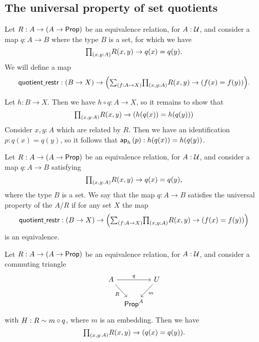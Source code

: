 \subsection{The universal property of set quotients}

\begin{defn}
Let $R:A\to (A\to \mathsf{Prop})$ be an equivalence relation, for $A:\mathcal{U}$, and consider a map $q:A\to B$ where the type $B$ is a set, for which we have
\begin{equation*}
\prd{x,y:A}R(x,y)\to q(x)=q(y).
\end{equation*}
We will define a map
\begin{equation*}
\quotientrestr:(B\to X) \to \Big(\sm{f:A\to X}\prd{x,y:A}R(x,y)\to (f(x)=f(y))\Big).
\end{equation*}
\end{defn}

\begin{constr}
Let $h:B\to X$. Then we have $h\circ q : A\to X$, so it remains to show that
\begin{equation*}
\prd{x,y:A}R(x,y)\to (h(q(x))=h(q(y)))
\end{equation*}
Consider $x,y:A$ which are related by $R$. Then we have an identification $p:q(x)=q(y)$, so it follows that $\mathsf{ap}_{h}\left({p}\right):h(q(x))=h(q(y))$.  
\end{constr}

\begin{defn}
Let $R:A\to (A\to \mathsf{Prop})$ be an equivalence relation, for $A:\mathcal{U}$, and consider a map $q:A\to B$ satisfying
\begin{equation*}
\prd{x,y:A}R(x,y)\to q(x)=q(y),
\end{equation*}
where the type $B$ is a set. We say that the map $q:A\to B$ satisfies the universal property of the  $A/R$ if for any set $X$ the map
\begin{equation*}
\quotientrestr : (B\to X) \to \Big(\sm{f:A\to X}\prd{x,y:A}R(x,y)\to (f(x)=f(y))\Big)
\end{equation*}
is an equivalence.
\end{defn}

\begin{lem}
Let $R:A\to (A\to \mathsf{Prop})$ be an equivalence relation, for $A:\mathcal{U}$, and consider a commuting triangle
\begin{equation*}
\begin{tikzcd}[column sep=tiny]
A \arrow[rr,"q"] \arrow[dr,swap,"R"] & & U \arrow[dl,"m"] \\
& \prop^A
\end{tikzcd}
\end{equation*}
with $H:R\sim m\circ q$, where $m$ is an embedding. Then we have
\begin{equation*}
\prd{x,y:A}R(x,y)\to (q(x)=q(y)).
\end{equation*}
\end{lem}

